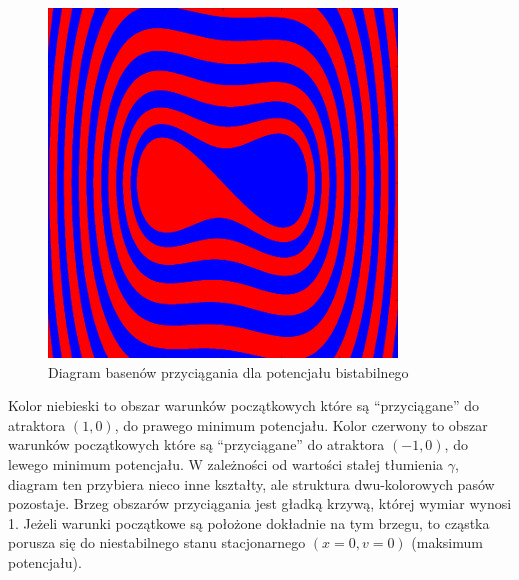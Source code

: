 \documentclass[a4paper,12pt,polish]{sphinxmanual}
\begin{document}
\begin{figure}[htbp]
\centering
\capstart

\includegraphics{baseny_tarcie.jpg}
\caption{Diagram basenów przyciągania dla potencjału bistabilnego}\end{figure}

Kolor niebieski to obszar warunków początkowych które są ``przyciągane''  do atraktora $(1, 0)$, do prawego
minimum potencjału. Kolor czerwony to obszar warunków początkowych które są ``przyciągane''  do atraktora
$(-1, 0)$, do lewego minimum potencjału. W zależności od wartości stałej tłumienia $\gamma$, diagram
ten przybiera nieco inne kształty, ale struktura dwu-kolorowych pasów pozostaje. Brzeg obszarów przyciągania jest
gładką krzywą, której wymiar wynosi 1. Jeżeli warunki początkowe są położone dokładnie na tym brzegu, to cząstka
porusza się do niestabilnego stanu stacjonarnego $(x=0, v=0)$ (maksimum potencjału).
\end{document}
